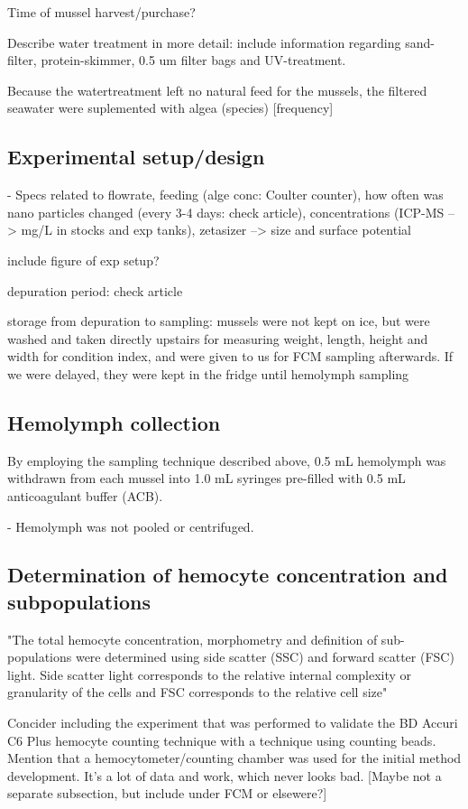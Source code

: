 Time of mussel harvest/purchase?

Describe water treatment in more detail: include information regarding sand-filter, protein-skimmer, 0.5 um filter bags and UV-treatment.

Because the watertreatment left no natural feed for the mussels, the filtered seawater were suplemented with algea (species) [frequency]


\subsection{Experimental setup/design}
- Specs related to flowrate, feeding (alge conc: Coulter counter), how often was nano particles changed (every 3-4 days: check article), concentrations (ICP-MS --> mg/L in stocks and exp tanks), zetasizer --> size and surface potential

include figure of exp setup?

depuration period: check article

storage from depuration to sampling: mussels were not kept on ice, but were washed and taken directly upstairs for measuring weight, length, height and width for condition index, and were given to us for FCM sampling afterwards. If we were delayed, they were kept in the fridge until hemolymph sampling 


\subsection{Hemolymph collection}
By employing the sampling technique described above, 0.5 mL hemolymph was withdrawn from each mussel into 1.0 mL syringes pre-filled with 0.5 mL anticoagulant buffer (ACB).

- Hemolymph was not pooled or centrifuged. 

\subsection{Determination of hemocyte concentration and subpopulations}
"The total hemocyte concentration, morphometry and definition of sub-populations were determined using side scatter (SSC) and forward scatter (FSC) light. Side scatter light corresponds to the relative internal complexity or granularity of the cells and FSC corresponds to the relative cell size" \cite{Rolton2020}

Concider including the experiment that was performed to validate the BD Accuri C6 Plus hemocyte counting technique with a technique using counting beads. Mention that a hemocytometer/counting chamber was used for the initial method development. It's a lot of data and work, which never looks bad. [Maybe not a separate subsection, but include under FCM or elsewere?]

